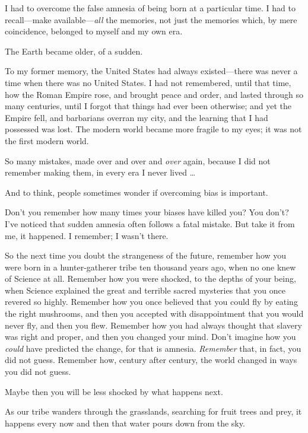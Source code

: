 {
 I had to overcome the false amnesia of being born at a particular
time. I had to recall---make available---\textit{all} the memories, not
just the memories which, by mere coincidence, belonged to myself and my
own era.}

{
 The Earth became older, of a sudden.}

{
 To my former memory, the United States had always existed---there
was never a time when there was no United States. I had not remembered,
until that time, how the Roman Empire rose, and brought peace and
order, and lasted through so many centuries, until I forgot that things
had ever been otherwise; and yet the Empire fell, and barbarians
overran my city, and the learning that I had possessed was lost. The
modern world became more fragile to my eyes; it was not the first
modern world.}

{
 So many mistakes, made over and over and \textit{over} again,
because I did not remember making them, in every era I never lived
\ldots}

{
 And to think, people sometimes wonder if overcoming bias is
important.}

{
 Don't you remember how many times your biases have
killed you? You don't? I've noticed
that sudden amnesia often follows a fatal mistake. But take it from me,
it happened. I remember; I wasn't there.}

{
 So the next time you doubt the strangeness of the future, remember
how you were born in a hunter-gatherer tribe ten thousand years ago,
when no one knew of Science at all. Remember how you were shocked, to
the depths of your being, when Science explained the great and terrible
sacred mysteries that you once revered so highly. Remember how you once
believed that you could fly by eating the right mushrooms, and then you
accepted with disappointment that you would never fly, and then you
flew. Remember how you had always thought that slavery was right and
proper, and then you changed your mind. Don't imagine
how you \textit{could} have predicted the change, for that is amnesia.
\textit{Remember} that, in fact, you did not guess. Remember how,
century after century, the world changed in ways you did not guess.}

{
 Maybe then you will be less shocked by what happens next.}

\myendsectiontext


\bigskip


{
 As our tribe wanders through the grasslands, searching for fruit
trees and prey, it happens every now and then that water pours down
from the sky. }

